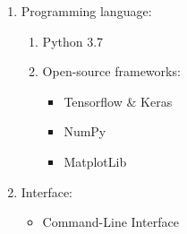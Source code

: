 \begin{enumerate}
    \item Programming language:
    \begin{enumerate}
        \item Python 3.7
        \item Open-source frameworks:
        \begin{itemize}
            \item Tensorflow \& Keras
            \item NumPy
            \item MatplotLib
        \end{itemize}
    \end{enumerate}
    
    \item Interface:
    \begin{itemize}
        \item Command-Line Interface
    \end{itemize}
    
\end{enumerate}
